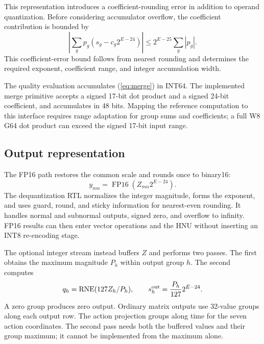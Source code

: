\documentclass[journal,10pt]{IEEEtran}
\newcommand{\RNE}{\operatorname{RNE}}
\begin{document}
This representation introduces a coefficient-rounding error in addition to operand quantization. Before considering accumulator overflow, the coefficient contribution is bounded by
\begin{equation}
\left|\sum_g p_g(s_g-c_g2^{E-24})\right|
\leq 2^{E-25}\sum_g|p_g|.
\end{equation}
This coefficient-error bound follows from nearest rounding and determines the required exponent, coefficient range, and integer accumulation width.

The quality evaluation accumulates (\ref{eq:merge}) in INT64. The implemented merge primitive accepts a signed 17-bit dot product and a signed 24-bit coefficient, and accumulates in 48 bits. Mapping the reference computation to this interface requires range adaptation for group sums and coefficients; a full W8 G64 dot product can exceed the signed 17-bit input range.

\subsection{Output representation}
The FP16 path restores the common scale and rounds once to binary16:
\begin{equation}
y_{mn}=\operatorname{FP16}(Z_{mn}2^{E-24}).
\end{equation}
The dequantization RTL normalizes the integer magnitude, forms the exponent, and uses guard, round, and sticky information for nearest-even rounding. It handles normal and subnormal outputs, signed zero, and overflow to infinity. FP16 results can then enter vector operations and the HNU without inserting an INT8 re-encoding stage.

The optional integer stream instead buffers $Z$ and performs two passes. The first obtains the maximum magnitude $P_h$ within output group $h$. The second computes
\begin{equation}
q_h=\RNE(127Z_h/P_h),\qquad
s_h^{\rm out}=\frac{P_h}{127}2^{E-24}.
\end{equation}
A zero group produces zero output. Ordinary matrix outputs use 32-value groups along each output row. The action projection groups along time for the seven action coordinates. The second pass needs both the buffered values and their group maximum; it cannot be implemented from the maximum alone.
\end{document}
